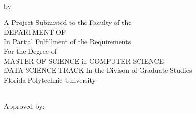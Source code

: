 %
%
%

\pagestyle{empty}
\begin{center}
	{{\bfseries\large{\MakeUppercase{\thesisTitle} \\}}\par}
	\vspace*{5mm}
	{by\\\vspace*{2mm}\textsc{\thesisBy}\par}
	\vspace*{5mm}
	A Project Submitted to the Faculty of the \\
	DEPARTMENT OF {\MakeUppercase{\thesisDegreeDepartment}}\\
	In Partial Fulfillment of the Requirements\\
	For the Degree of\\
	MASTER OF SCIENCE in COMPUTER SCIENCE\\ 
	DATA SCIENCE TRACK
	In the Divison of Graduate Studies\\\vspace*{1.5mm}
	Florida Polytechnic University\\\vspace*{5mm}
	\small  \thesisDate \\\vspace*{1.5mm}
	\vfill
	\begin{flushleft}
		Approved by:\\
	\end{flushleft}
\end{center}
\pagebreak